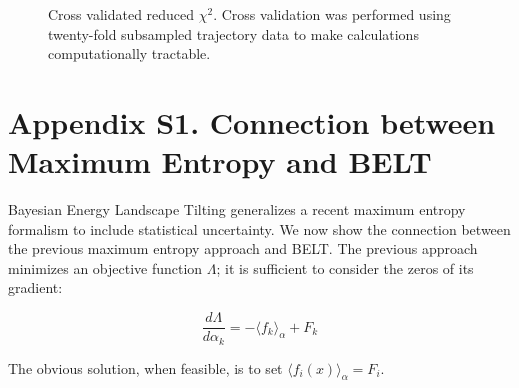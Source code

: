 \documentclass[12pt]{article}
\begin{document}
\begin{figure}

\caption{
Cross validated reduced $\chi^2$.  Cross validation was performed using twenty-fold subsampled trajectory data to make calculations computationally tractable.  
}
\label{figure:cross_val}
\end{figure}


\clearpage

\section*{Appendix S1.  Connection between Maximum Entropy and BELT}


Bayesian Energy Landscape Tilting generalizes a recent maximum entropy formalism \cite{chodera2012} to include statistical uncertainty.  We now show the connection between the previous maximum entropy approach \cite{chodera2012} and BELT.  The previous approach minimizes an objective function $\Lambda$; it is sufficient to consider the zeros of its gradient:

$$\frac{d\Lambda}{d\alpha_k} = -\langle f_k \rangle_\alpha + F_k$$

The obvious solution, when feasible, is to set $\langle f_i(x) \rangle_\alpha = F_i$.  
\end{document}
